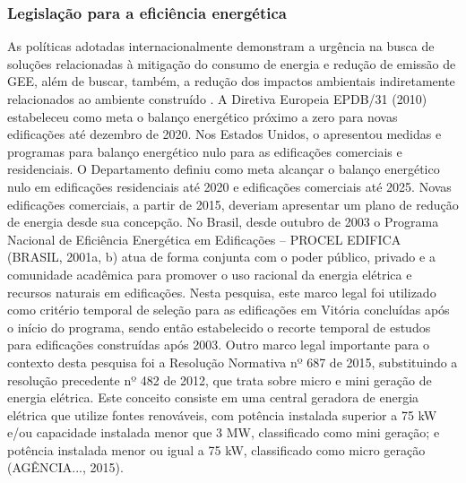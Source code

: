 \begin{onehalfspace}
\subsubsection{Legislação para a eficiência energética}
As políticas adotadas internacionalmente demonstram a urgência na busca de soluções relacionadas 
à mitigação do consumo de energia e redução de emissão de GEE, além de buscar, também, a redução 
dos impactos ambientais indiretamente relacionados ao ambiente construído \cite{InternationalMonetaryFund-IMF2018,InternationalEnergyAgency-IEA2018a}.\vspace{0.3cm} \newline
A Diretiva Europeia EPDB/31 (2010) estabeleceu como meta o balanço energético próximo a zero para 
novas edificações até dezembro de 2020. Nos Estados Unidos, o \textit{\textcite{U.S.DepartmentofEnergy-USDOE2015}}
apresentou medidas e programas para balanço energético nulo para as edificações comerciais e residenciais. 
O Departamento definiu como meta alcançar o balanço energético nulo em edificações residenciais 
até 2020 e edificações comerciais até 2025. Novas edificações comerciais, a partir de 2015, deveriam 
apresentar um plano de redução de energia desde sua concepção.\vspace{0.3cm} \newline
No Brasil, desde outubro de 2003 o Programa Nacional de Eficiência Energética em Edificações – 
PROCEL EDIFICA (BRASIL, 2001a, b) atua de forma conjunta com o poder público, privado e a comunidade 
acadêmica para promover o uso racional da energia elétrica e recursos naturais em edificações. 
Nesta pesquisa, este marco legal foi utilizado como critério temporal de seleção para as edificações 
em Vitória concluídas após o início do programa, sendo então estabelecido o recorte temporal de 
estudos para edificações construídas após 2003.\vspace{0.3cm} \newline
Outro marco legal importante para o contexto desta pesquisa foi a Resolução Normativa nº 687 de 2015, 
substituindo a resolução precedente nº 482 de 2012, que trata sobre micro e mini geração de energia 
elétrica. Este conceito consiste em uma central geradora de energia elétrica que utilize fontes 
renováveis, com potência instalada superior a 75 kW e/ou capacidade instalada menor que 3 MW, 
classificado como mini geração; e potência instalada menor ou igual a 75 kW, classificado como 
micro geração (AGÊNCIA..., 2015).\vspace{0.3cm} \newline

\end{onehalfspace}
